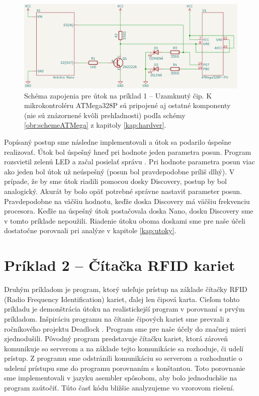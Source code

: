 \begin{figure}
    \centerline{\includegraphics[width=1\textwidth]{images/schemeCTF-LED.png}}
    \caption[Schéma zapojenia pre útok na príklad 1]{Schéma zapojenia pre útok na príklad 1 -- Uzamknutý čip. K mikrokontroléru ATMega328P sú pripojené aj ostatné komponenty (nie sú znázornené kvôli prehľadnosti) podľa schémy \ref{obr:schemeATMega} z kapitoly \ref{kap:hardver}.}
    \label{obr:schemeCTF-LED}
\end{figure}

Popísaný postup sme následne implementovali a útok sa podarilo úspešne realizovať. Útok bol úspešný hneď pri hodnote jeden parametra posun. Program rozsvietil zelenú LED a začal posielať správu . Pri hodnote parametra posun viac ako jeden bol útok už neúspešný (posun bol pravdepodobne príliš dlhý). V prípade, že by sme útok riadili pomocou dosky Discovery, postup by bol analogický. Akurát by bolo opäť potrebné správne nastaviť parameter posun. Pravdepodobne na väčšiu hodnotu, keďže doska Discovery má väčšiu frekvenciu procesora. Keďže na úspešný útok postačovala doska Nano, dosku Discovery sme v tomto príklade nepoužili. Riadenie útoku oboma doskami sme pre naše účeli dostatočne porovnali pri analýze v kapitole \ref{kap:utoky}.

\section{Príklad 2 -- Čítačka RFID kariet} \label{kap4:sek:priklad2}
Druhým príkladom je program, ktorý udeľuje prístup na základe čítačky RFID (Radio Frequency Identification) kariet, ďalej len čipová karta. Cieľom tohto príkladu je demonštrácia útoku na realistickejší program v porovnaní s prvým príkladom. Inšpiráciu programu na čítanie čipových kariet sme prevzali z ročníkového projektu Deadlock \cite{deadlock}. Program sme pre naše účely do značnej mieri zjednodušili. Pôvodný program predstavuje čítačku kariet, ktorá zároveň komunikuje so serverom a na základe tejto komunikácie sa rozhoduje, či udelí prístup. Z programu sme odstránili komunikáciu so serverom a rozhodnutie o udelení prístupu sme  do programu porovnaním s konštantou. Toto porovnanie sme implementovali v jazyku asembler spôsobom, aby bolo jednoduchšie na program zaútočiť. Túto časť kódu bližšie analyzujeme vo vzorovom riešení.

